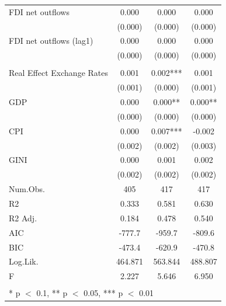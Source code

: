 \documentclass[
]{article}
\begin{document}
\begin{table}
\begin{tabular}[t]{lccc}
\hspace{1em}FDI net outflows & 0.000 & 0.000 & 0.000\\
\hspace{1em} & (0.000) & (0.000) & \vphantom{2} (0.000)\\
\hspace{1em}FDI net outflows (lag1) & 0.000 & 0.000 & 0.000\\
\hspace{1em} & (0.000) & (0.000) & \vphantom{1} (0.000)\\
\addlinespace[0.3em]
\multicolumn{4}{l}{\textbf{Control variable}}\\
\hspace{1em}Real Effect Exchange Rates & 0.001 & 0.002*** & 0.001\\
\hspace{1em} & (0.001) & (0.000) & (0.001)\\
\hspace{1em}GDP & 0.000 & 0.000** & 0.000**\\
\hspace{1em} & (0.000) & (0.000) & (0.000)\\
\hspace{1em}CPI & 0.000 & 0.007*** & -0.002\\
\hspace{1em} & (0.002) & (0.002) & (0.003)\\
\hspace{1em}GINI & 0.000 & 0.001 & 0.002\\
\hspace{1em} & (0.002) & (0.002) & (0.002)\\
\midrule
Num.Obs. & 405 & 417 & 417\\
R2 & 0.333 & 0.581 & 0.630\\
R2 Adj. & 0.184 & 0.478 & 0.540\\
AIC & -777.7 & -959.7 & -809.6\\
BIC & -473.4 & -620.9 & -470.8\\
Log.Lik. & 464.871 & 563.844 & 488.807\\
F & 2.227 & 5.646 & 6.950\\
\bottomrule
\multicolumn{4}{l}{\textsuperscript{} * p $<$ 0.1, ** p $<$ 0.05, *** p $<$ 0.01}\\
\end{tabular}
\end{table}
\end{document}
